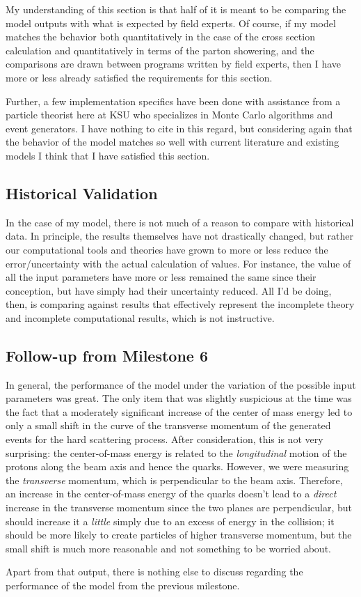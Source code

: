 My understanding of this section is that half of it is meant to be comparing the model outputs with what is expected by field experts. Of course, if my model matches the behavior both quantitatively in the case of the cross section calculation and quantitatively in terms of the parton showering, and the comparisons are drawn between programs written by field experts, then I have more or less already satisfied the requirements for this section.

Further, a few implementation specifics have been done with assistance from a particle theorist here at KSU who specializes in Monte Carlo algorithms and event generators. I have nothing to cite in this regard, but considering again that the behavior of the model matches so well with current literature and existing models I think that I have satisfied this section.



\subsection{Historical Validation}

In the case of my model, there is not much of a reason to compare with historical data. In principle, the results themselves have not drastically changed, but rather our computational tools and theories have grown to more or less reduce the error/uncertainty with the actual calculation of values. For instance, the value of all the input parameters have more or less remained the same since their conception, but have simply had their uncertainty reduced. All I'd be doing, then, is comparing against results that effectively represent the incomplete theory and incomplete computational results, which is not instructive.


\subsection{Follow-up from Milestone 6}

In general, the performance of the model under the variation of the possible input parameters was great. The only item that was slightly suspicious at the time was the fact that a moderately significant increase of the center of mass energy led to only a small shift in the curve of the transverse momentum of the generated events for the hard scattering process. After consideration, this is not very surprising: the center-of-mass energy is related to the \textit{longitudinal} motion of the protons along the beam axis and hence the quarks. However, we were measuring the \textit{transverse} momentum, which is perpendicular to the beam axis. Therefore, an increase in the center-of-mass energy of the quarks doesn't lead to a \textit{direct} increase in the transverse momentum since the two planes are perpendicular, but should increase it a \textit{little} simply due to an excess of energy in the collision; it should be more likely to create particles of higher transverse momentum, but the small shift is much more reasonable and not something to be worried about.

Apart from that output, there is nothing else to discuss regarding the performance of the model from the previous milestone.






